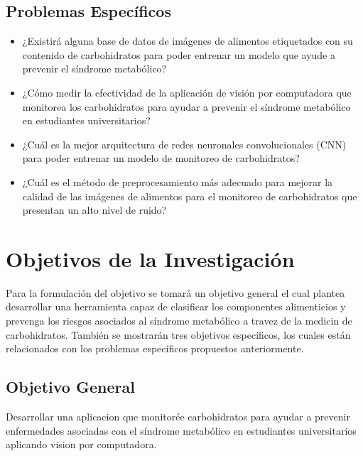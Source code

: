 \subsection{Problemas Espec\'{i}ficos}
\newcommand{\Pbone}{
¿Existirá alguna base de datos de imágenes de alimentos etiquetados con su contenido de carbohidratos para poder entrenar un modelo que ayude a prevenir el síndrome metabólico?
}
\newcommand{\Pbtwo}{
¿Cómo medir la efectividad de la aplicación de visión por computadora que monitorea los carbohidratos para ayudar a prevenir el síndrome metabólico en estudiantes universitarios?
}
\newcommand{\Pbthree}{
¿Cuál es la mejor arquitectura de redes neuronales convolucionales (CNN) para poder entrenar un modelo de monitoreo de carbohidratos?
}
\newcommand{\Pbfour}{
¿Cuál es el método de preprocesamiento más adecuado para mejorar la calidad de las imágenes de alimentos para el monitoreo de carbohidratos que presentan un alto nivel de ruido?
}

\begin{itemize}
	\item \Pbone
	\item \Pbtwo
	\item \Pbthree
 	\item \Pbfour
\end{itemize}

\section{Objetivos de la Investigación}

Para la formulación del objetivo se tomará un objetivo general el cual plantea desarrollar una herramienta capaz de clasificar los componentes alimenticios y prevenga los riesgos asociados al  síndrome metabólico a travez de la medicin de carbohidratos. También se mostrarán tres objetivos específicos, los cuales están relacionados con los problemas específicos propuestos anteriormente. 

\subsection{Objetivo General}
\newcommand{\ObjetivoGeneral}{
Desarrollar una aplicacion que monitorée carbohidratos para ayudar a prevenir enfermedades asociadas con el síndrome metabólico en estudiantes universitarios aplicando vision por computadora.
}
\ObjetivoGeneral

